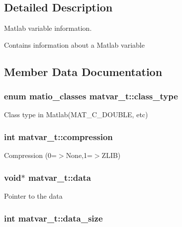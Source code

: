 \subsection{\-Detailed \-Description}
\-Matlab variable information. 

\-Contains information about a \-Matlab variable 

\subsection{\-Member \-Data \-Documentation}
\hypertarget{structmatvar__t_aff13035bf3265dd7d9425e5d40c839d4}{
\subsubsection[{class\-\_\-type}]{\setlength{\rightskip}{0pt plus 5cm}enum {\bf matio\-\_\-classes} {\bf matvar\-\_\-t\-::class\-\_\-type}}}\label{structmatvar__t_aff13035bf3265dd7d9425e5d40c839d4}
\-Class type in \-Matlab(\-M\-A\-T\-\_\-\-C\-\_\-\-D\-O\-U\-B\-L\-E, etc) \hypertarget{structmatvar__t_a327abc8f4be853b9f26bc054ce1029e5}{
\subsubsection[{compression}]{\setlength{\rightskip}{0pt plus 5cm}int {\bf matvar\-\_\-t\-::compression}}}\label{structmatvar__t_a327abc8f4be853b9f26bc054ce1029e5}
\-Compression (0=$>$\-None,1=$>$\-Z\-L\-I\-B) \hypertarget{structmatvar__t_a70d5c21dc70558757770d4d72ff5d3f4}{
\subsubsection[{data}]{\setlength{\rightskip}{0pt plus 5cm}void$\ast$ {\bf matvar\-\_\-t\-::data}}}\label{structmatvar__t_a70d5c21dc70558757770d4d72ff5d3f4}
\-Pointer to the data \hypertarget{structmatvar__t_a9ad1c82e2b568da617e12dc73a26e1f9}{
\subsubsection[{data\-\_\-size}]{\setlength{\rightskip}{0pt plus 5cm}int {\bf matvar\-\_\-t\-::data\-\_\-size}}}\label{structmatvar__t_a9ad1c82e2b568da617e12dc73a26e1f9}

